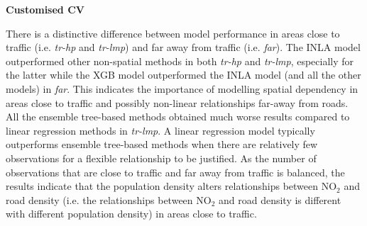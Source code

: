 \documentclass{article}
\begin{document}
\vspace{0.5cm}
\noindent \textbf{Customised CV}

There is a distinctive difference between model performance in areas close to traffic (i.e. \textit{tr-hp} and \textit{tr-lmp}) and far away from traffic (i.e. \textit{far}). The INLA model outperformed other non-spatial methods in both \textit{tr-hp} and \textit{tr-lmp}, especially for the latter while the XGB model outperformed the INLA model (and all the other models) in \textit{far}. This indicates the importance of modelling spatial dependency in areas close to traffic and possibly non-linear relationships far-away from roads. All the ensemble tree-based methods obtained much worse results compared to linear regression methods in \textit{tr-lmp}. A linear regression model typically outperforms ensemble tree-based methods when there are relatively few observations for a flexible relationship to be justified. As the number of observations that are close to traffic and far away from traffic is balanced, the results indicate that the population density alters relationships between NO$_2$ and road density (i.e. the relationships between NO$_2$ and road density is different with different population density) in areas close to traffic. 
\end{document}
